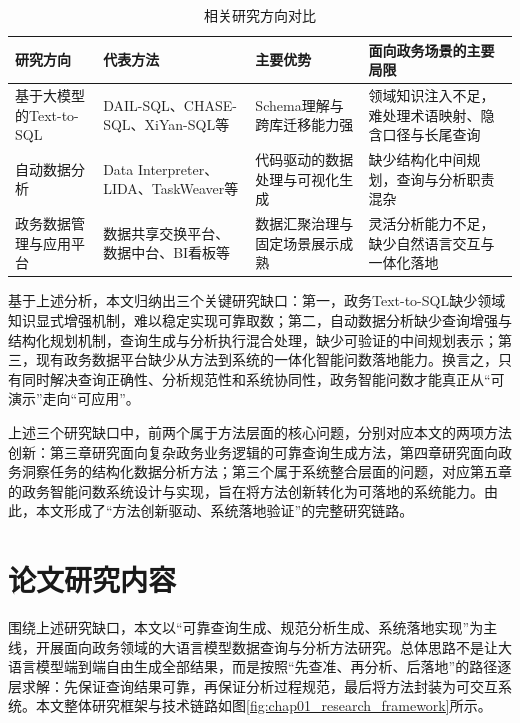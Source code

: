 \begin{table}[htbp]
	\setlength{\abovecaptionskip}{5pt}
	\setlength{\belowcaptionskip}{5pt}
	\caption{相关研究方向对比}\label{tab:chap01_related_work}
	\centering
	\footnotesize
	\setlength{\tabcolsep}{3pt}
	\renewcommand{\arraystretch}{1.3}
		\begin{tabular}{p{2.4cm}p{4.2cm}p{4.0cm}p{3.3cm}}
		\toprule
		研究方向 & 代表方法 & 主要优势 & 面向政务场景的主要局限 \\
		\midrule
		基于大模型的Text-to-SQL &
			DAIL-SQL、CHASE-SQL、XiYan-SQL等\cite{gao2024text2sql,pourreza2024chase,gao2024xiyan} &
		Schema理解与跨库迁移能力强 &
		领域知识注入不足，难处理术语映射、隐含口径与长尾查询 \\
		\midrule
		自动数据分析 &
			Data Interpreter、LIDA、TaskWeaver等\cite{hong2024datainterpreter,dibia2023lida,qin2024taskweaver} &
		代码驱动的数据处理与可视化生成 &
		缺少结构化中间规划，查询与分析职责混杂 \\
		\midrule
		政务数据管理与应用平台 &
		数据共享交换平台、数据中台、BI看板等 &
		数据汇聚治理与固定场景展示成熟 &
		灵活分析能力不足，缺少自然语言交互与一体化落地 \\
		\bottomrule
	\end{tabular}
	\renewcommand{\arraystretch}{1.0}
\end{table}

基于上述分析，本文归纳出三个关键研究缺口：第一，政务Text-to-SQL缺少领域知识显式增强机制，难以稳定实现可靠取数；第二，自动数据分析缺少查询增强与结构化规划机制，查询生成与分析执行混合处理，缺少可验证的中间规划表示；第三，现有政务数据平台缺少从方法到系统的一体化智能问数落地能力。换言之，只有同时解决查询正确性、分析规范性和系统协同性，政务智能问数才能真正从“可演示”走向“可应用”。

上述三个研究缺口中，前两个属于方法层面的核心问题，分别对应本文的两项方法创新：第三章研究面向复杂政务业务逻辑的可靠查询生成方法，第四章研究面向政务洞察任务的结构化数据分析方法；第三个属于系统整合层面的问题，对应第五章的政务智能问数系统设计与实现，旨在将方法创新转化为可落地的系统能力。由此，本文形成了“方法创新驱动、系统落地验证”的完整研究链路。


\section{论文研究内容}

围绕上述研究缺口，本文以“可靠查询生成、规范分析生成、系统落地实现”为主线，开展面向政务领域的大语言模型数据查询与分析方法研究。总体思路不是让大语言模型端到端自由生成全部结果，而是按照“先查准、再分析、后落地”的路径逐层求解：先保证查询结果可靠，再保证分析过程规范，最后将方法封装为可交互系统。本文整体研究框架与技术链路如图\ref{fig:chap01_research_framework}所示。

